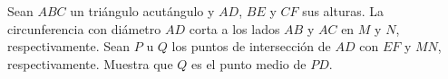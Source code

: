 Sean $ABC$ un triángulo acutángulo y $AD$, $BE$ y $CF$ sus alturas. La circunferencia con diámetro $AD$ corta a los lados $AB$ y $AC$ en $M$ y $N$, respectivamente. Sean $P$ u $Q$ los puntos de intersección de $AD$ con $EF$ y $MN$, respectivamente. Muestra que $Q$ es el punto medio de $PD$.